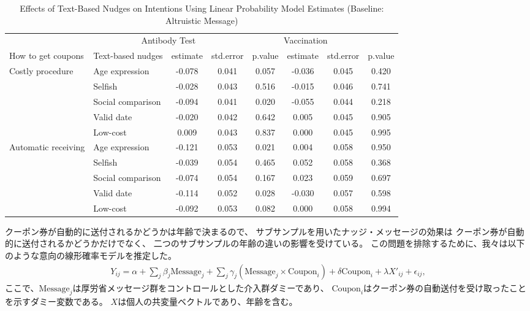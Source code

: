 \documentclass[
  11pt,
  a4paper,
]{article}
\begin{document}
\begin{table}

\caption{\label{tab:int-reg-ftest2}Effects of Text-Based Nudges on Intentions Using Linear Probability Model Estimates (Baseline: Altruistic Message)}
\centering
\begin{tabular}[t]{>{\raggedright\arraybackslash}p{5em}lcccccc}
\toprule
\multicolumn{2}{c}{ } & \multicolumn{3}{c}{Antibody Test} & \multicolumn{3}{c}{Vaccination} \\
\cmidrule(l{3pt}r{3pt}){3-5} \cmidrule(l{3pt}r{3pt}){6-8}
How to get coupons & Text-based nudges & estimate & std.error & p.value & estimate  & std.error  & p.value \\
\midrule
Costly procedure & Age expression & -0.078 & 0.041 & 0.057 & -0.036 & 0.045 & 0.420\\
 & Selfish & -0.028 & 0.043 & 0.516 & -0.015 & 0.046 & 0.741\\
 & Social comparison & -0.094 & 0.041 & 0.020 & -0.055 & 0.044 & 0.218\\
 & Valid date & -0.020 & 0.042 & 0.642 & 0.005 & 0.045 & 0.905\\
 & Low-cost & 0.009 & 0.043 & 0.837 & 0.000 & 0.045 & 0.995\\
Automatic receiving & Age expression & -0.121 & 0.053 & 0.021 & 0.004 & 0.058 & 0.950\\
 & Selfish & -0.039 & 0.054 & 0.465 & 0.052 & 0.058 & 0.368\\
 & Social comparison & -0.074 & 0.054 & 0.167 & 0.023 & 0.059 & 0.697\\
 & Valid date & -0.114 & 0.052 & 0.028 & -0.030 & 0.057 & 0.598\\
 & Low-cost & -0.092 & 0.053 & 0.082 & 0.000 & 0.058 & 0.994\\
\bottomrule
\end{tabular}
\end{table}

クーポン券が自動的に送付されるかどうかは年齢で決まるので、
サブサンプルを用いたナッジ・メッセージの効果は
クーポン券が自動的に送付されるかどうかだけでなく、
二つのサブサンプルの年齢の違いの影響を受けている。
この問題を排除するために、我々は以下のような意向の線形確率モデルを推定した。
\begin{align}
  Y_{ij} = \alpha + \sum_j \beta_j \text{Message}_j
           + \sum_j \gamma_j (\text{Message}_j \times \text{Coupon}_i)
           + \delta \text{Coupon}_i + \lambda X'_{ij} + \epsilon_{ij},
\end{align}
ここで、\(\text{Message}_j\)は厚労省メッセージ群をコントロールとした介入群ダミーであり、
\(\text{Coupon}_i\)はクーポン券の自動送付を受け取ったことを示すダミー変数である。
\(X\)は個人の共変量ベクトルであり、年齢を含む。
\end{document}
